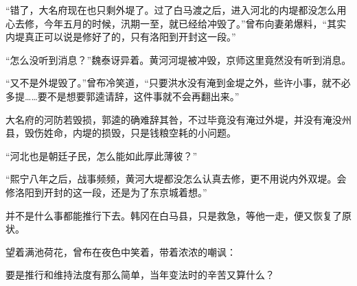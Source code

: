 “错了，大名府现在也只剩外堤了。过了白马渡之后，进入河北的内堤都没怎么用心去修，今年五月的时候，汛期一至，就已经给冲毁了。”曾布向妻弟爆料，“其实内堤真正可以说是修好了的，只有洛阳到开封这一段。”

“怎么没听到消息？”魏泰讶异着。黄河河堤被冲毁，京师这里竟然没有听到消息。

“又不是外堤毁了。”曾布冷笑道，“只要洪水没有淹到金堤之外，些许小事，就不必多提……要不是想要郭逵请辞，这件事就不会再翻出来。”

大名府的河防若毁损，郭逵的确难辞其咎，不过毕竟没有淹过外堤，并没有淹没州县，毁伤姓命，内堤的损毁，只是钱粮空耗的小问题。

“河北也是朝廷子民，怎么能如此厚此薄彼？”

“熙宁八年之后，战事频频，黄河大堤都没怎么认真去修，更不用说内外双堤。会修洛阳到开封的这一段，还是为了东京城着想。”

并不是什么事都能推行下去。韩冈在白马县，只是救急，等他一走，便又恢复了原状。

望着满池荷花，曾布在夜色中笑着，带着浓浓的嘲讽：

要是推行和维持法度有那么简单，当年变法时的辛苦又算什么？

